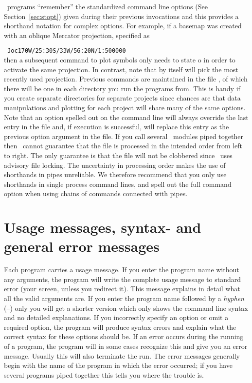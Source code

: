 \GMT\ programs ``remember'' the standardized command line options
(See Section~\ref{sec:stopt}) given during their previous invocations
and this provides a shorthand notation for complex options.
For example, if a basemap was created with an oblique Mercator
projection, specified as

\vspace{\baselineskip} 

\texttt{-Joc170W/25:30S/33W/56:20N/1:500000} \\ 

\vspace{\baselineskip} 
\noindent
then a subsequent  command to plot symbols only needs
to state o in order to activate the same projection.  In
contrast, note that  by itself will pick the most recently used projection.
Previous commands are maintained in the file ,
of which there will be one in each directory you run the programs
from.  This is handy if you create separate directories for
separate projects since chances are that data manipulations
and plotting for each project will share many of the same options.
Note that an option spelled out on the command line will always
override the last entry in the  file and,
if execution is successful, will replace this entry as the
previous option argument in the  file.
If you call several \GMT\ modules piped together then \GMT\ cannot
guarantee that the  file is processed
in the intended order from left to right.  The only guarantee
is that the file will not be clobbered since \GMT\ uses advisory
file locking.  The uncertainty in processing order makes the use
of shorthands in pipes unreliable.  We therefore recommend that you
only use shorthands in single process command lines, and spell out
the full command option when using chains of commands connected with
pipes.

\section{Usage messages, syntax- and general error messages}

Each program carries a usage message.  If you enter the program
name without any arguments, the program will write the complete
usage message to standard error (your screen, unless you
redirect it).  This message explains in detail what all the
valid arguments are.  If you enter the program name followed
by a \emph{hyphen} (--) only you will get a shorter version
which only shows the command line syntax and no detailed
explanations.  If you incorrectly specify an option or omit
a required option, the program will produce syntax errors and
explain what the correct syntax for these options should be.
If an error occurs during the running of a program, the
program will in some cases recognize this and give you an
error message.  Usually this will also terminate the run.
The error messages generally begin with the name of the
program in which the error occurred; if you have several
programs piped together this tells you where the trouble is. 

